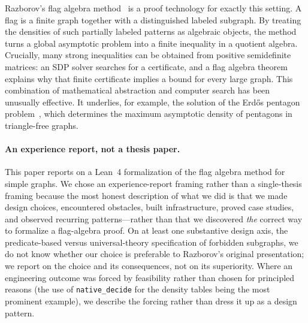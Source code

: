 \documentclass{article}
\newcommand{\lean}[1]{\texttt{#1}}
\begin{document}
Razborov's flag algebra method~\cite{razborov2007flag} is a proof technology
for exactly this setting.  A flag is a finite graph together with a
distinguished labeled subgraph.  By treating the densities of such partially
labeled patterns as algebraic objects, the method turns a global asymptotic
problem into a finite inequality in a quotient algebra.  Crucially, many
strong inequalities can be obtained from positive semidefinite matrices: an
SDP solver searches for a certificate, and a flag algebra theorem explains
why that finite certificate implies a bound for every large graph.  This
combination of mathematical abstraction and computer search has been unusually
effective.  It underlies, for example, the solution of the Erd\H{o}s pentagon
problem~\cite{hatami2012,grzesik2012}, which determines the maximum asymptotic
density of pentagons in triangle-free graphs.

\paragraph{An experience report, not a thesis paper.}
This paper reports on a Lean~4 formalization of the flag algebra method for
simple graphs.  We chose an experience-report framing rather than a
single-thesis framing because the most honest description of what we did is
that we made design choices, encountered obstacles, built infrastructure,
proved case studies, and observed recurring patterns---rather than that we
discovered \emph{the} correct way to formalize a flag-algebra proof.  On at
least one substantive design axis, the predicate-based versus
universal-theory specification of forbidden subgraphs, we do not know whether
our choice is preferable to Razborov's original presentation; we report on
the choice and its consequences, not on its superiority.  Where an engineering
outcome was forced by feasibility rather than chosen for principled reasons
(the use of \lean{native\_decide} for the density tables being the most
prominent example), we describe the forcing rather than dress it up as a
design pattern.
\end{document}

